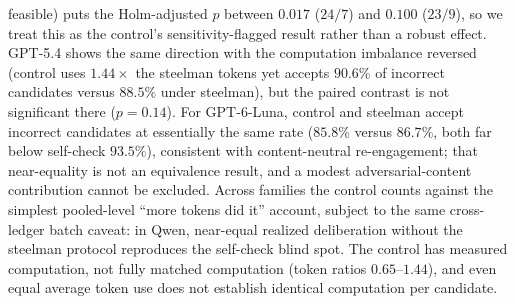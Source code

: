 \documentclass[a4paper,journal]{IAENGtran}
\begin{document}
feasible) puts the Holm-adjusted $p$ between $0.017$ ($24/7$) and $0.100$ ($23/9$), so we
treat this as the control's sensitivity-flagged result rather than a robust effect. GPT-5.4
shows the same direction with the computation imbalance reversed (control uses
$1.44\times$ the steelman tokens yet accepts $90.6\%$ of incorrect candidates versus
$88.5\%$ under steelman), but the paired contrast is not significant there ($p=0.14$). For GPT-6-Luna, control and
steelman accept incorrect candidates at essentially the same rate ($85.8\%$ versus
$86.7\%$, both far below self-check $93.5\%$), consistent with content-neutral
re-engagement; that near-equality is not an equivalence result, and a modest
adversarial-content contribution cannot be excluded. Across families the control
counts against the simplest pooled-level ``more tokens did it'' account, subject to
the same cross-ledger batch caveat: in Qwen,
near-equal realized deliberation without the
steelman protocol reproduces the self-check blind spot. The
control has measured computation, not fully matched computation (token ratios
$0.65$--$1.44$), and even equal average token use does not establish identical
computation per candidate.

\begin{table}[!t]
\centering
\small
\caption{Neutral re-examination control versus the two production arms on the
triple-paired incorrect stratum (ground truth assigned, parsed verdict from all three
arms; $n_{T=0}$ is its size per family). $\hat\kappa$ is false acceptance in percent;
the token ratio is realized mean control-versus-steelman completion tokens; $b/c$
counts discordant incorrect candidates (control accepts, steelman rejects versus the
reverse); $p$ is the exact McNemar value for the control-versus-steelman contrast.}
\label{tab:control}
\end{table}
\end{document}
